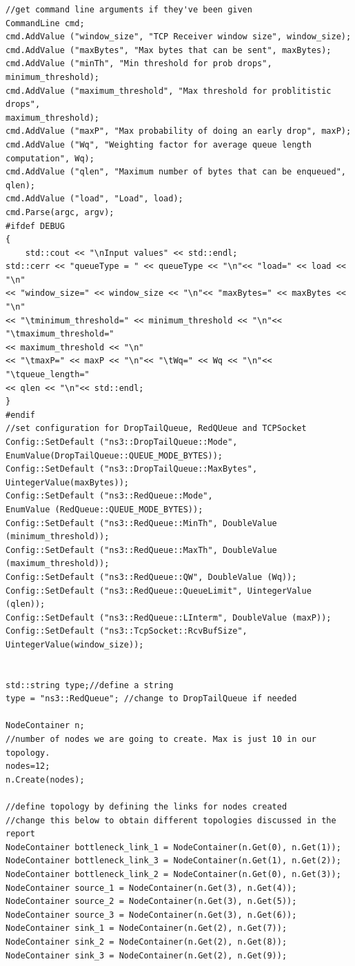 \documentclass[paper=a4, fontsize=12pt]{scrartcl} %
\numberwithin{equation}{section} %
\numberwithin{figure}{section} %
\numberwithin{table}{section} %
\begin{document}
\begin{lstlisting}
//get command line arguments if they've been given
CommandLine cmd;
cmd.AddValue ("window_size", "TCP Receiver window size", window_size);
cmd.AddValue ("maxBytes", "Max bytes that can be sent", maxBytes);
cmd.AddValue ("minTh", "Min threshold for prob drops", minimum_threshold);
cmd.AddValue ("maximum_threshold", "Max threshold for problitistic drops", 
maximum_threshold);
cmd.AddValue ("maxP", "Max probability of doing an early drop", maxP);
cmd.AddValue ("Wq", "Weighting factor for average queue length computation", Wq);
cmd.AddValue ("qlen", "Maximum number of bytes that can be enqueued", qlen);
cmd.AddValue ("load", "Load", load);
cmd.Parse(argc, argv);
#ifdef DEBUG
{
	std::cout << "\nInput values" << std::endl;
std::cerr << "queueType = " << queueType << "\n"<< "load=" << load << "\n"
<< "window_size=" << window_size << "\n"<< "maxBytes=" << maxBytes << "\n"
<< "\tminimum_threshold=" << minimum_threshold << "\n"<< "\tmaximum_threshold=" 
<< maximum_threshold << "\n"
<< "\tmaxP=" << maxP << "\n"<< "\tWq=" << Wq << "\n"<< "\tqueue_length=" 
<< qlen << "\n"<< std::endl;
}	
#endif
//set configuration for DropTailQueue, RedQUeue and TCPSocket
Config::SetDefault ("ns3::DropTailQueue::Mode", 
EnumValue(DropTailQueue::QUEUE_MODE_BYTES));
Config::SetDefault ("ns3::DropTailQueue::MaxBytes", UintegerValue(maxBytes));
Config::SetDefault ("ns3::RedQueue::Mode", 
EnumValue (RedQueue::QUEUE_MODE_BYTES));
Config::SetDefault ("ns3::RedQueue::MinTh", DoubleValue (minimum_threshold));
Config::SetDefault ("ns3::RedQueue::MaxTh", DoubleValue (maximum_threshold));
Config::SetDefault ("ns3::RedQueue::QW", DoubleValue (Wq));
Config::SetDefault ("ns3::RedQueue::QueueLimit", UintegerValue (qlen));
Config::SetDefault ("ns3::RedQueue::LInterm", DoubleValue (maxP));
Config::SetDefault ("ns3::TcpSocket::RcvBufSize", UintegerValue(window_size));


std::string type;//define a string
type = "ns3::RedQueue"; //change to DropTailQueue if needed

NodeContainer n;
//number of nodes we are going to create. Max is just 10 in our topology.
nodes=12;
n.Create(nodes);

//define topology by defining the links for nodes created
//change this below to obtain different topologies discussed in the report
NodeContainer bottleneck_link_1 = NodeContainer(n.Get(0), n.Get(1));
NodeContainer bottleneck_link_3 = NodeContainer(n.Get(1), n.Get(2));
NodeContainer bottleneck_link_2 = NodeContainer(n.Get(0), n.Get(3));
NodeContainer source_1 = NodeContainer(n.Get(3), n.Get(4));
NodeContainer source_2 = NodeContainer(n.Get(3), n.Get(5));
NodeContainer source_3 = NodeContainer(n.Get(3), n.Get(6));
NodeContainer sink_1 = NodeContainer(n.Get(2), n.Get(7));
NodeContainer sink_2 = NodeContainer(n.Get(2), n.Get(8));
NodeContainer sink_3 = NodeContainer(n.Get(2), n.Get(9));


\end{lstlisting}
\end{document}
